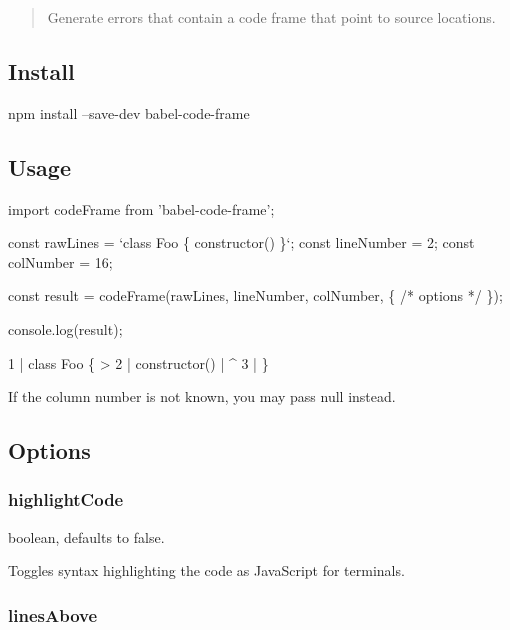 \begin{quote}
Generate errors that contain a code frame that point to source locations. \end{quote}


\subsection*{Install}


\begin{DoxyCode}
npm install --save-dev babel-code-frame
\end{DoxyCode}


\subsection*{Usage}


\begin{DoxyCode}
import codeFrame from 'babel-code-frame';

const rawLines = `class Foo \{
  constructor()
\}`;
const lineNumber = 2;
const colNumber = 16;

const result = codeFrame(rawLines, lineNumber, colNumber, \{ /* options */ \});

console.log(result);
\end{DoxyCode}



\begin{DoxyCode}
  1 | class Foo \{
> 2 |   constructor()
    |                ^
  3 | \}
\end{DoxyCode}


If the column number is not known, you may pass {\ttfamily null} instead.

\subsection*{Options}

\subsubsection*{{\ttfamily highlight\+Code}}

{\ttfamily boolean}, defaults to {\ttfamily false}.

Toggles syntax highlighting the code as Java\+Script for terminals.

\subsubsection*{{\ttfamily lines\+Above}}

